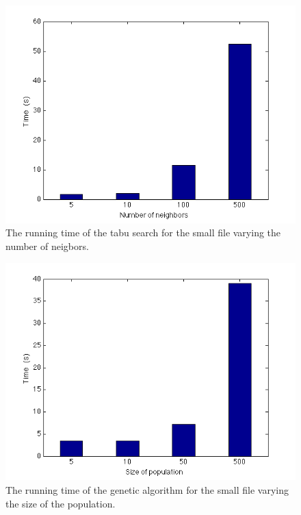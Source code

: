 \documentclass[titlepage,a4paper]{article}
\begin{document}
\begin{figure}[H]
  \begin{center}
    \includegraphics[scale=0.5]{../results/figures/tabu_neighbor.png}
  \end{center}
  \caption{The running time of the tabu search for the small file varying the number of neigbors.}
  \label{tabu_neighbor}
\end{figure}

\begin{figure}[H]
  \begin{center}
    \includegraphics[scale=0.5]{../results/figures/genetic_population.png}
  \end{center}
  \caption{The running time of the genetic algorithm for the small file varying the size of the population.}
  \label{genetic_pop}
\end{figure}
\end{document}
